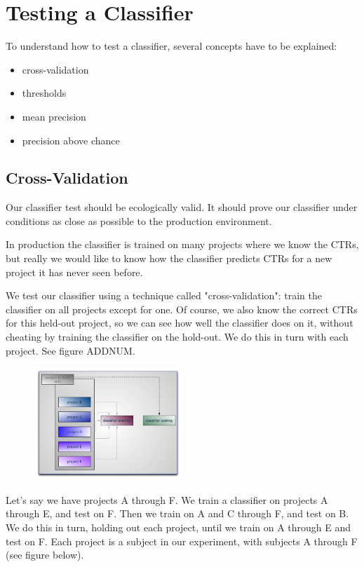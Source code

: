 \section{Testing a Classifier}

To understand how to test a classifier, several concepts have to be explained:

\begin{itemize}
\item cross-validation
\item thresholds
\item mean precision
\item precision above chance
\end{itemize}

\subsection*{Cross-Validation}

Our classifier test should be ecologically valid. It should prove our classifier under conditions as close as possible to the production environment.

In production the classifier is trained on many projects where we know the CTRs, but really we would like to know how the classifier predicts CTRs for a new project it has never seen before.

We test our classifier using a technique called "cross-validation": train the classifier on all projects except for one. Of course, we also know the correct CTRs for this held-out project, so we can see how well the classifier does on it, without cheating by training the classifier on the hold-out. We do this in turn with each project. See figure ADDNUM.

\begin{figure}
\centering
\includegraphics[width=0.5\textwidth]{img/testclass/1.png}
\caption{
}
\label{Fig.1}
\end{figure}

Let’s say we have projects A through F. We train a classifier on projects A through E, and test on F. Then we train on A and C through F, and test on B. We do this in turn, holding out each project, until we train on A through E and test on F. Each project is a subject in our experiment, with subjects A through F (see figure below).

